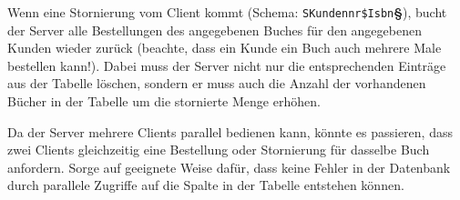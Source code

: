 Wenn eine Stornierung vom Client kommt (Schema:
\lstinline|SKundennr$Isbn|\textbf{§}), bucht der Server alle Bestellungen des
angegebenen Buches für den angegebenen Kunden wieder zurück (beachte, dass ein
Kunde ein Buch auch mehrere Male bestellen kann!). Dabei muss der Server nicht
nur die entsprechenden Einträge aus der Tabelle 
löschen, sondern er muss auch die Anzahl der vorhandenen Bücher in der Tabelle
 um die stornierte Menge erhöhen.

Da der Server mehrere Clients parallel bedienen kann, könnte es passieren, dass
zwei Clients gleichzeitig eine Bestellung oder Stornierung für dasselbe Buch
anfordern. Sorge auf geeignete Weise dafür, dass keine Fehler in der Datenbank
durch parallele Zugriffe auf die Spalte  in der Tabelle
 entstehen können.